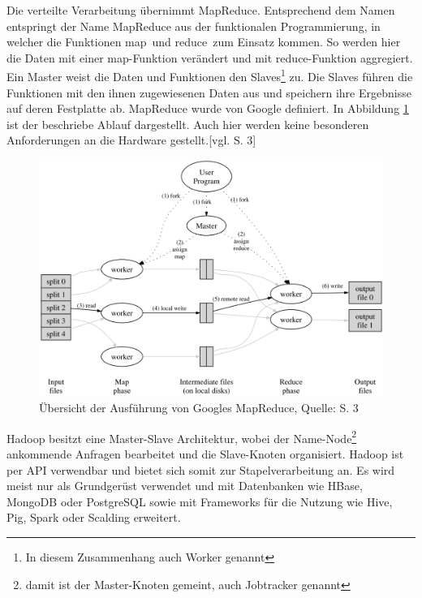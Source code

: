 Die verteilte Verarbeitung übernimmt MapReduce.
Entsprechend dem Namen entspringt der Name MapReduce aus der funktionalen Programmierung, in welcher die Funktionen \glqq map\grqq \ und \glqq reduce\grqq \ zum Einsatz kommen.
So werden hier die Daten mit einer map-Funktion verändert und mit reduce-Funktion aggregiert.
Ein Master weist die Daten und Funktionen den Slaves\footnote{In diesem Zusammenhang auch Worker genannt} zu.
Die Slaves führen die Funktionen mit den ihnen zugewiesenen Daten aus und speichern ihre Ergebnisse auf deren Festplatte ab.
MapReduce wurde von Google definiert.
In Abbildung \ref{fig:mapreduce} ist der beschriebe Ablauf dargestellt.
Auch hier werden keine besonderen Anforderungen an die Hardware gestellt.[vgl. \cite{paper:mapreduce} S. 3]

\begin{figure}[h]
\centering
\includegraphics[width=\textwidth]{Abbildungen/mapreduce.png}
\caption[Übersicht der Ausführung von Googles MapReduce]{Übersicht der Ausführung von Googles MapReduce, Quelle: \cite{paper:mapreduce} S. 3}
\label{fig:mapreduce}
\end{figure}

Hadoop besitzt eine Master-Slave Architektur, wobei der Name-Node\footnote{damit ist der Master-Knoten gemeint, auch Jobtracker genannt} ankommende Anfragen bearbeitet und die Slave-Knoten organisiert.
Hadoop ist per API verwendbar und bietet sich somit zur Stapelverarbeitung an. %
Es wird meist nur als Grundgerüst verwendet und mit Datenbanken wie HBase, MongoDB oder PostgreSQL sowie mit Frameworks für die Nutzung wie Hive, Pig, Spark oder Scalding erweitert.





